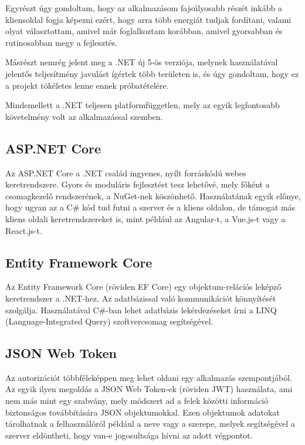 Egyrészt úgy gondoltam, hogy az alkalmazásom fajsúlyosabb részét inkább a kliensoldal fogja képezni ezért, hogy arra több energiát tudjak fordítani, valami olyat választottam,
amivel már foglalkoztam korábban, amivel gyorsabban és rutinosabban megy a fejlesztés.

Másrészt nemrég jelent meg a .NET új 5-ös verziója, melynek használatával jelentős teljesítmény javulást ígértek több területen is, és úgy gondoltam, hogy ez a projekt tökéletes lenne
ennek próbatételére.

Mindemellett a .NET teljesen platformfüggetlen, mely az egyik legfontosabb követelmény volt az alkalmazással szemben.

\subsection{ASP.NET Core}
Az ASP.NET Core a .NET család ingyenes, nyílt forráskódú webes keretrendszere. Gyors és moduláris fejlesztést tesz lehetővé, 
mely főként a csomagkezelő rendszerének, a NuGet-nek \cite{nuget} köszönhető.
Használatának egyik előnye, hogy ugyan az a C\# kód tud futni a szerver és a kliens oldalon, de támogat más kliens oldali keretrendszereket is, mint például az Angular-t, a Vue.js-t
vagy a React.js-t.

\subsection{Entity Framework Core}
Az Entity Framework Core (röviden EF Core) egy objektum-relációs leképző keretrendszer a .NET-hez. Az adatbázissal való kommunikációt könnyítését szolgálja. 
Használatával C\#-ban lehet adatbázis lekérdezéseket írni a LINQ (Language-Integrated Query) szoftvercsomag segítségével.

\subsection{JSON Web Token}
Az autorizációt többféleképpen meg lehet oldani egy alkalmazás szempontjából. Az egyik ilyen megoldás a JSON Web Token-ek (röviden JWT) \cite{jwt} használata,
ami nem más mint egy szabvány, mely módszert ad a felek közötti információ biztonságos továbbítására JSON objektumokkal.
Ezen objektumok adatokat tárolhatnak a felhasználóról például a neve vagy a szerepe, melyek segítségével a szerver eldöntheti, 
hogy van-e jogosultsága hívni az adott végpontot.

